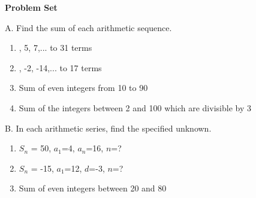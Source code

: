 \textbf{Problem Set}

\vspce

A. Find the sum of each arithmetic sequence. 
\begin{enumerate}
\item {}, 5, 7,... to 31 terms
\item {}, -2, -14,... to 17 terms
\item \hspce Sum of even integers from 10 to 90
\item \hspce Sum of the  integers between  2 and 100 which are divisible by 3
\end{enumerate}

\vspce

B. In each arithmetic series, find the specified unknown. 
\begin{enumerate}
\item \hspce $S_{n}$ = 50, $a_{1}$=4, $a_{n}$=16, $n$=? 
\item \hspce $S_{n}$ = -15, $a_{1}$=12, $d$=-3, $n$=? 
\item \hspce Sum of even integers between  20 and 80
\end{enumerate}
